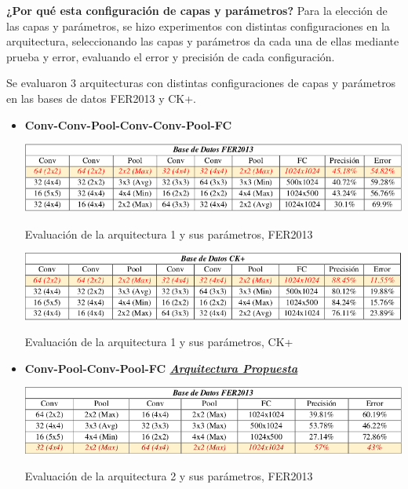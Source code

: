 \textbf{¿Por qué esta configuración de capas y parámetros?} Para la elección de las
capas y parámetros, se hizo experimentos con distintas configuraciones en la
arquitectura, seleccionando las capas y parámetros da cada una de ellas mediante
prueba y error, evaluando el error y precisión de cada configuración.

Se evaluaron 3 arquitecturas con distintas configuraciones de capas y parámetros
en las bases de datos FER2013 y CK+.



\begin{itemize}
\item {\textbf{Conv-Conv-Pool-Conv-Conv-Pool-FC}

\begin{table}[H]
    \centering
    \includegraphics[width=140mm]{./Imagenes/tabla_arqui_1_fer.png} 
    \caption{Evaluación de la arquitectura 1 y sus parámetros, FER2013}
    \label{tab:tabla_arqui_1_fer}
\end{table}

\begin{table}[H]
    \centering
    \includegraphics[width=140mm]{./Imagenes/tabla_arqui_1_CK.png}
    \caption{Evaluación de la arquitectura 1 y sus parámetros, CK+}
    \label{tab:tabla_arqui_1_CK}
\end{table}

}

\item {\textbf{Conv-Pool-Conv-Pool-FC \underline{\textit{Arquitectura Propuesta}} }

\begin{table}[H]
    \centering
    \includegraphics[width=140mm]{./Imagenes/tabla_arqui_2_fer.png} 
    \caption{Evaluación de la arquitectura 2 y sus parámetros, FER2013}
    \label{tab:tabla_arqui_2_fer}
\end{table}

}
\end{itemize}
